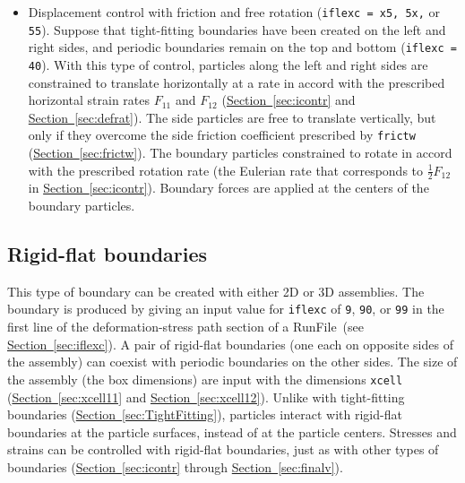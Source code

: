 \documentclass[letterpaper,11pt]{article}
\newcommand{\RunFile}{\textsf{RunFile}}
\begin{document}
\begin{itemize}
(\texttt{iflexc = 40}).
With this type of control, particles along the left and right sides
are constrained to translate horizontally at
a rate in accord with the prescribed horizontal strain rates $F_{11}$
and $F_{12}$
(\hyperref[sec:icontr]{Section~\ref*{sec:icontr}}
and \hyperref[sec:defrat]{Section~\ref*{sec:defrat}}).
The side particles are free to translate vertically, but only if they
overcome the side friction coefficient prescribed by 
\texttt{frictw}
(\hyperref[sec:frictw]{Section~\ref*{sec:frictw}}).
The boundary particles are allowed to rotate.
Boundary forces are applied at the centers of the boundary particles.
\item
Displacement control with friction and free rotation
(\texttt{iflexc = x5, 5x,} or \texttt{55}).
Suppose that tight-fitting boundaries have been created on the left
and right sides, and periodic boundaries remain on the top and bottom
(\texttt{iflexc = 40}).
With this type of control, particles along the left and right sides
are constrained to translate horizontally at
a rate in accord with the prescribed horizontal strain rates $F_{11}$
and $F_{12}$
(\hyperref[sec:icontr]{Section~\ref*{sec:icontr}}
and \hyperref[sec:defrat]{Section~\ref*{sec:defrat}}).
The side particles are free to translate vertically, but only if they
overcome the side friction coefficient prescribed by
\texttt{frictw}
(\hyperref[sec:frictw]{Section~\ref*{sec:frictw}}).
The boundary particles constrained to rotate in accord with the
prescribed rotation rate (the Eulerian rate that corresponds
to $\frac{1}{2}F_{12}$ in
\hyperref[sec:icontr]{Section~\ref*{sec:icontr}}).
Boundary forces are applied at the centers of the boundary particles.
\end{itemize}
%
\subsection{Rigid-flat boundaries}\label{sec:RigidFlat}
This type of boundary can be created with either 2D or 3D assemblies.
The boundary is produced by giving an input value for 
\texttt{iflexc} of \texttt{9}, \texttt{90}, or \texttt{99}
in the first line of the deformation-stress path section
of a \RunFile\ (see 
\hyperref[sec:iflexc]{Section~\ref*{sec:iflexc}}).
A pair of rigid-flat boundaries (one each on opposite sides of
the assembly) can coexist with periodic boundaries on the other sides.
The size of the assembly (the box dimensions) are input
with the dimensions \texttt{xcell} 
(\hyperref[sec:xcell11]{Section~\ref*{sec:xcell11}}
and \hyperref[sec:xcell12]{Section~\ref*{sec:xcell12}}).
Unlike with tight-fitting boundaries
(\hyperref[sec:TightFitting]{Section~\ref*{sec:TightFitting}}),
particles interact with rigid-flat boundaries at the particle
surfaces, instead of at the particle centers.
Stresses and strains can be controlled with rigid-flat boundaries,
just as with other types of boundaries
(\hyperref[sec:icontr]{Section~\ref*{sec:icontr}}
through \hyperref[sec:finalv]{Section~\ref*{sec:finalv}}).
%
\end{document}
